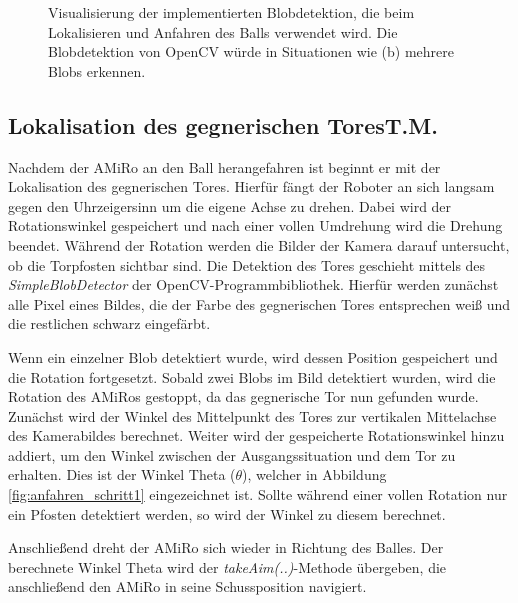 \begin{figure}
	\caption[Blobdetektion des Balls]{Visualisierung der implementierten Blobdetektion, die beim Lokalisieren und Anfahren des Balls verwendet wird. Die Blobdetektion von OpenCV würde in Situationen wie (b) mehrere Blobs erkennen.}
	\label{fig:moveToBall}
\end{figure}

\subsection[Lokalisation des gegnerischen Tores]{Lokalisation des gegnerischen Tores\hfill {\normalsize T.M.}} %

Nachdem der AMiRo an den Ball herangefahren ist beginnt er mit der Lokalisation des gegnerischen Tores. 
Hierfür fängt der Roboter an sich langsam gegen den Uhrzeigersinn um die eigene Achse zu drehen. Dabei wird der Rotationswinkel gespeichert und nach einer vollen Umdrehung wird die Drehung beendet. 
Während der Rotation werden die Bilder der Kamera darauf untersucht, ob die Torpfosten sichtbar sind. Die Detektion des Tores geschieht mittels des \textit{SimpleBlobDetector} der OpenCV-Programmbibliothek. Hierfür werden zunächst alle Pixel eines Bildes, die der Farbe des gegnerischen Tores entsprechen weiß und die restlichen schwarz eingefärbt.

Wenn ein einzelner Blob detektiert wurde, wird dessen Position gespeichert und die Rotation fortgesetzt. Sobald zwei Blobs im Bild detektiert wurden, wird die Rotation des AMiRos gestoppt, da das gegnerische Tor nun gefunden wurde. Zunächst wird der Winkel des Mittelpunkt des Tores zur vertikalen Mittelachse des Kamerabildes berechnet. Weiter wird der gespeicherte Rotationswinkel hinzu addiert, um den Winkel zwischen der Ausgangssituation und dem Tor zu erhalten. Dies ist der Winkel Theta ($\theta$), welcher in Abbildung \ref{fig:anfahren_schritt1} eingezeichnet ist. 
Sollte während einer vollen Rotation nur ein Pfosten detektiert werden, so wird der Winkel zu diesem berechnet.

Anschließend dreht der AMiRo sich wieder in Richtung des Balles. Der berechnete Winkel Theta wird der \textit{takeAim(..)}-Methode übergeben, die anschließend den AMiRo in seine Schussposition navigiert.

